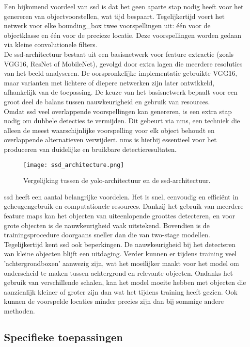 Een bijkomend voordeel van \gls{ssd} is dat het geen aparte stap nodig heeft voor het genereren van objectvoorstellen, wat tijd bespaart. Tegelijkertijd voert het netwerk voor elke \gls{bounding_box} twee voorspellingen uit: één voor de objectklasse en één voor de precieze locatie. Deze voorspellingen worden gedaan via kleine convolutionele filters. \\

De \gls{ssd}-architectuur bestaat uit een basisnetwerk voor feature extractie (zoals VGG16, ResNet of MobileNet), gevolgd door extra lagen die meerdere resoluties van het beeld analyseren. De oorspronkelijke implementatie gebruikte VGG16, maar varianten met lichtere of diepere netwerken zijn later ontwikkeld, afhankelijk van de toepassing. De keuze van het basisnetwerk bepaalt voor een groot deel de balans tussen nauwkeurigheid en gebruik van resources. \\

Omdat \gls{ssd} veel overlappende voorspellingen kan genereren, is een extra stap nodig om dubbele detecties te vermijden. Dit gebeurt via \gls{nms}, een techniek die alleen de meest waarschijnlijke voorspelling voor elk object behoudt en overlappende alternatieven verwijdert. \gls{nms} is hierbij essentieel voor het produceren van duidelijke en bruikbare detectieresultaten. \\

\begin{figure}[H]
    \centering
    \texttt{[image: ssd\_architecture.png]}
    \caption[Vergelijking YOLO- en SSD-architectuur.]{\label{fig:ssd_architecture}Vergelijking tussen de \gls{yolo}-architectuur en de \gls{ssd}-architectuur. \autocite{Liu_2016}}
\end{figure}

\gls{ssd} heeft een aantal belangrijke voordelen. Het is snel, eenvoudig en efficiënt in geheugengebruik en computationele resources. Dankzij het gebruik van meerdere feature maps kan het objecten van uiteenlopende groottes detecteren, en voor grote objecten is de nauwkeurigheid vaak uitstekend. Bovendien is de trainingsprocedure doorgaans sneller dan die van two-stage modellen. \\

Tegelijkertijd kent \gls{ssd} ook beperkingen. De nauwkeurigheid bij het detecteren van kleine objecten blijft een uitdaging. Verder kunnen er tijdens training veel 'achtergrondboxen' aanwezig zijn, wat het moeilijker maakt voor het model om onderscheid te maken tussen achtergrond en relevante objecten. Ondanks het gebruik van verschillende schalen, kan het model moeite hebben met objecten die aanzienlijk kleiner of groter zijn dan wat het tijdens training heeft gezien. Ook kunnen de voorspelde locaties minder precies zijn dan bij sommige andere methoden.

\autocite{Ma_2020}
\autocite{Kumar_2020}
\autocite{Liu_2016}
\autocite{Jiang_2020}

\subsection{Specifieke toepassingen}

\lipsum[1-3]